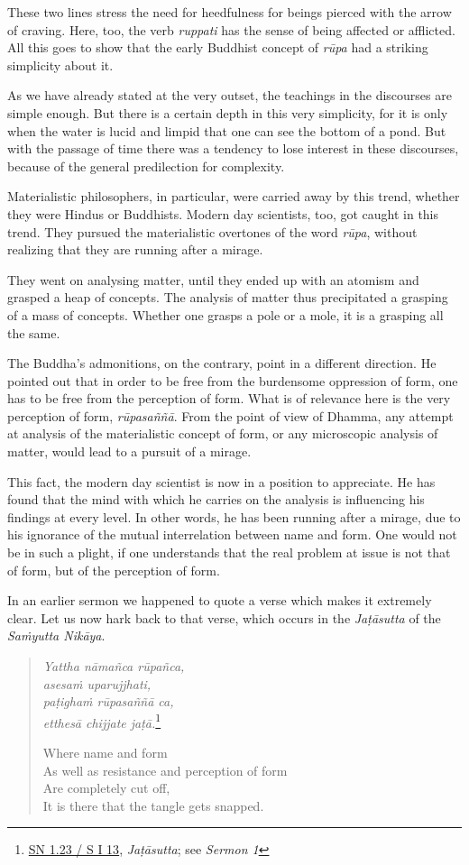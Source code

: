 These two lines stress the need for heedfulness for beings pierced with the arrow of craving. Here, too, the verb \emph{ruppati} has the sense of being affected or afflicted. All this goes to show that the early Buddhist concept of \emph{rūpa} had a striking simplicity about it.

As we have already stated at the very outset, the teachings in the discourses are simple enough. But there is a certain depth in this very simplicity, for it is only when the water is lucid and limpid that one can see the bottom of a pond. But with the passage of time there was a tendency to lose interest in these discourses, because of the general predilection for complexity.

Materialistic philosophers, in particular, were carried away by this trend, whether they were Hindus or Buddhists. Modern day scientists, too, got caught in this trend. They pursued the materialistic overtones of the word \emph{rūpa}, without realizing that they are running after a mirage.

They went on analysing matter, until they ended up with an atomism and grasped a heap of concepts. The analysis of matter thus precipitated a grasping of a mass of concepts. Whether one grasps a pole or a mole, it is a grasping all the same.

The Buddha's admonitions, on the contrary, point in a different direction. He pointed out that in order to be free from the burdensome oppression of form, one has to be free from the perception of form. What is of relevance here is the very perception of form, \emph{rūpasaññā}. From the point of view of Dhamma, any attempt at analysis of the materialistic concept of form, or any microscopic analysis of matter, would lead to a pursuit of a mirage.

This fact, the modern day scientist is now in a position to appreciate. He has found that the mind with which he carries on the analysis is influencing his findings at every level. In other words, he has been running after a mirage, due to his ignorance of the mutual interrelation between name and form. One would not be in such a plight, if one understands that the real problem at issue is not that of form, but of the perception of form.

In an earlier sermon we happened to quote a verse which makes it extremely clear. Let us now hark back to that verse, which occurs in the \emph{Jaṭāsutta} of the \emph{Saṁyutta Nikāya}.

\begin{quote}
\emph{Yattha nāmañca rūpañca,}\\
\emph{asesaṁ uparujjhati,}\\
\emph{paṭighaṁ rūpasaññā ca,}\\
\emph{etthesā chijjate jaṭā.}\footnote{\href{https://suttacentral.net/sn1.23/pli/ms}{SN 1.23 / S I 13}, \emph{Jaṭāsutta}; see \emph{Sermon 1}}

Where name and form\\
As well as resistance and perception of form\\
Are completely cut off,\\
It is there that the tangle gets snapped.
\end{quote}

